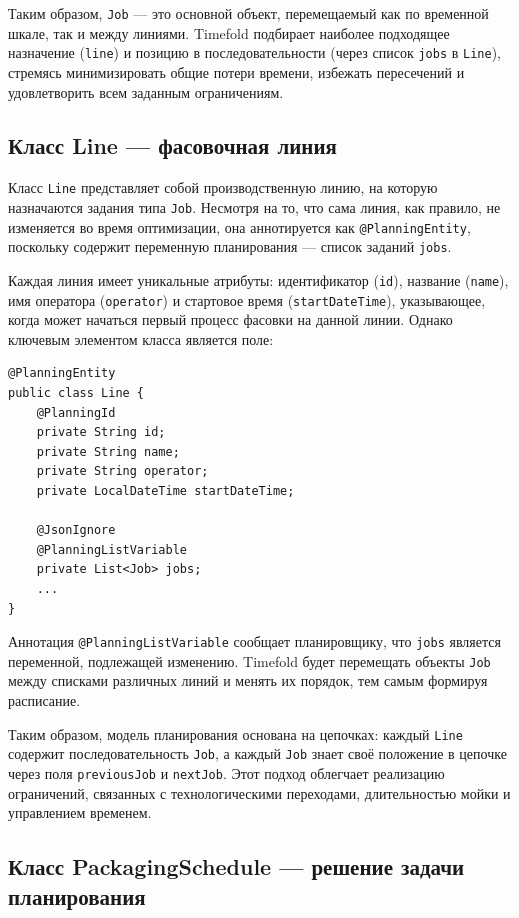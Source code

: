 Таким образом, \texttt{Job} — это основной объект, перемещаемый как по временной шкале, так и между линиями. Timefold подбирает наиболее подходящее назначение (\texttt{line}) и позицию в последовательности (через список \texttt{jobs} в \texttt{Line}), стремясь минимизировать общие потери времени, избежать пересечений и удовлетворить всем заданным ограничениям.

\subsection*{Класс Line — фасовочная линия}

Класс \texttt{Line} представляет собой производственную линию, на которую назначаются задания типа \texttt{Job}. Несмотря на то, что сама линия, как правило, не изменяется во время оптимизации, она аннотируется как \texttt{@PlanningEntity}, поскольку содержит переменную планирования — список заданий \texttt{jobs}.

Каждая линия имеет уникальные атрибуты: идентификатор (\texttt{id}), название (\texttt{name}), имя оператора (\texttt{operator}) и стартовое время (\texttt{startDateTime}), указывающее, когда может начаться первый процесс фасовки на данной линии. Однако ключевым элементом класса является поле:

\begin{lstlisting}[caption={Класс Line}, label={lst:classLine}]
@PlanningEntity
public class Line {
    @PlanningId
    private String id;
    private String name;
    private String operator;
    private LocalDateTime startDateTime;

    @JsonIgnore
    @PlanningListVariable
    private List<Job> jobs;
    ...
}
\end{lstlisting}

Аннотация \texttt{@PlanningListVariable} сообщает планировщику, что \texttt{jobs} является переменной, подлежащей изменению. Timefold будет перемещать объекты \texttt{Job} между списками различных линий и менять их порядок, тем самым формируя расписание.

Таким образом, модель планирования основана на цепочках: каждый \texttt{Line} содержит последовательность \texttt{Job}, а каждый \texttt{Job} знает своё положение в цепочке через поля \texttt{previousJob} и \texttt{nextJob}. Этот подход облегчает реализацию ограничений, связанных с технологическими переходами, длительностью мойки и управлением временем.

\subsection*{Класс PackagingSchedule — решение задачи планирования}

